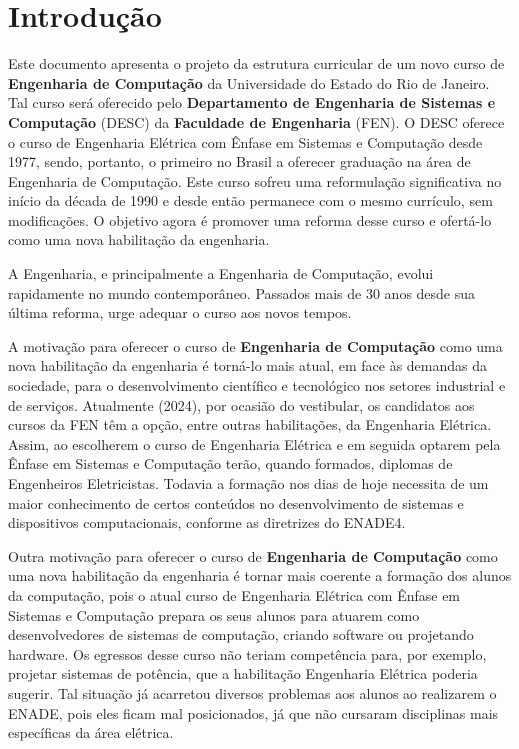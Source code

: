 \chapter{Introdução}
\label{intro} %

Este documento apresenta o projeto da estrutura curricular de um novo curso de \textbf{Engenharia de Computação} da Universidade do Estado do Rio de Janeiro. Tal curso será oferecido pelo \textbf{Departamento de Engenharia de Sistemas e Computação} (DESC) da \textbf{Faculdade de Engenharia} (FEN). O DESC oferece o curso de Engenharia Elétrica com Ênfase em Sistemas e Computação desde 1977, sendo, portanto, o primeiro no Brasil a oferecer graduação na área de Engenharia de Computação. Este curso sofreu uma reformulação significativa no início da década de 1990 e desde então permanece com o mesmo currículo, sem modificações. O objetivo agora é promover uma reforma desse curso e ofertá-lo como uma nova habilitação da engenharia.

A Engenharia, e principalmente a Engenharia de Computação, evolui rapidamente no mundo contemporâneo. Passados mais de 30 anos desde sua última reforma, urge adequar o curso aos novos tempos.

A motivação para oferecer o curso de \textbf{Engenharia de Computação} como uma nova habilitação da engenharia é torná-lo mais atual, em face às demandas da sociedade, para o desenvolvimento científico e tecnológico nos setores industrial e de serviços. Atualmente (2024), por ocasião do vestibular, os candidatos aos cursos da FEN têm a opção, entre outras habilitações, da Engenharia Elétrica. Assim, ao escolherem o curso de Engenharia Elétrica e em seguida optarem pela Ênfase em Sistemas e Computação terão, quando formados, diplomas de Engenheiros Eletricistas. Todavia a formação nos dias de hoje necessita de um maior conhecimento de certos conteúdos no desenvolvimento de sistemas e dispositivos computacionais, conforme as diretrizes do ENADE4.

Outra motivação para oferecer o curso de \textbf{Engenharia de Computação} como uma nova habilitação da engenharia é tornar mais coerente a formação dos alunos da computação, pois o atual curso de Engenharia Elétrica com Ênfase em Sistemas e Computação prepara os seus alunos para atuarem como desenvolvedores  de sistemas de computação, criando software ou projetando hardware. Os egressos desse curso não teriam competência para, por exemplo, projetar sistemas de potência, que a habilitação Engenharia Elétrica poderia sugerir. Tal situação já acarretou diversos problemas aos alunos ao realizarem o ENADE, pois eles ficam mal posicionados, já que não cursaram disciplinas mais específicas da área elétrica.

